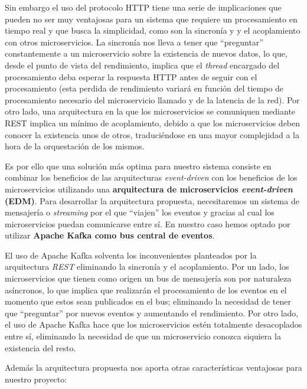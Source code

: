 Sin embargo el uso del protocolo HTTP tiene una serie de implicaciones que pueden no ser muy ventajosas para un sistema que requiere un procesamiento en tiempo real y que busca la simplicidad, como son la sincronía y y el acoplamiento con otros microservicios. La sincronía nos lleva a tener que ``preguntar'' constantemente a un microservicio sobre la existencia de nuevos datos, lo que, desde el punto de vista del rendimiento, implica que el \textit{thread} encargado del procesamiento deba esperar la respuesta HTTP antes de seguir con el procesamiento (esta perdida de rendimiento variará en función del tiempo de procesamiento necesario del microservicio llamado y de la latencia de la red).  Por otro lado, una arquitectura en la que los microservicios se comuniquen mediante REST implica un mínimo de acoplamiento, debido a que los microservicios deben conocer la existencia unos de otros, traduciéndose en una mayor complejidad a la hora de la orquestación de los mismos. 


Es por ello que una solución más optima para nuestro sistema consiste en combinar los beneficios de las arquitecturas \textit{event-driven} con los beneficios de los microservicios utilizando una \textbf{arquitectura de microservicios  \textit{event-driven} (EDM)}. Para desarrollar la arquitectura propuesta, necesitaremos un sistema de mensajería o \textit{streaming} por el que ``viajen'' los eventos y gracias al cual los microservicios puedan comunicarse entre sí. En nuestro caso hemos optado por utilizar \textbf{Apache Kafka como bus central de eventos}. 

El uso de Apache Kafka solventa los inconvenientes planteados por la arquitectura \textit{REST} eliminando la sincronía y el acoplamiento. Por un lado, los microservicios que tienen como origen un bus de mensajería son por naturaleza asíncronos, lo que implica que realizarán el procesamiento de los eventos en el momento que estos sean publicados en el bus; eliminando la necesidad de tener que ``preguntar'' por nuevos eventos y aumentando el rendimiento. Por otro lado, el uso de Apache Kafka hace que los microservicios estén totalmente desacoplados entre sí, eliminando la necesidad de que un microservicio conozca siquiera la existencia del resto. 

Además la arquitectura propuesta nos aporta otras características ventajosas para nuestro proyecto:

